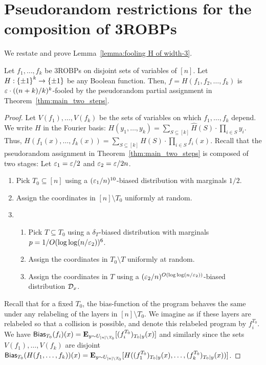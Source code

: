 \section{Pseudorandom restrictions for the composition of 3ROBPs}\label{app:composition 3ROBPs}
We restate and prove Lemma~\ref{lemma:fooling H of width-3}.
\begin{lemma}
Let $f_1, \ldots, f_k$ be 3ROBPs on disjoint sets of variables of $[n]$. 
Let $H:{\{\pm1\}}^k \to {\{\pm1\}}$ be any Boolean function.
Then, $f = H(f_1, f_2, \ldots, f_k)$ is $\varepsilon\cdot ((n+k)/k)^k$-fooled by the pseudorandom partial assignment in Theorem~\ref{thm:main_two_steps}.
\end{lemma}
\begin{proof}
Let $V(f_1), \ldots, V(f_k)$ be the sets of variables on which $f_1, \ldots, f_k$ depend.
We write $H$ in the Fourier basis:
$H(y_1, \ldots, y_k) = \sum_{S\subseteq [k]} \hat{H}(S) \cdot \prod_{i\in S}{y_i}$.
Thus,
$H(f_1(x), \ldots, f_k(x)) = \sum_{S\subseteq [k]} \hat{H}(S) \cdot \prod_{i\in S}{f_i(x)}$.
Recall that the pseudorandom assignment in Theorem~\ref{thm:main_two_steps} is composed of two stages:
Let $\varepsilon_1 = \varepsilon/2$ and $\varepsilon_2 = \varepsilon/2n$.
\begin{enumerate}
	\item Pick $T_0 \subseteq [n]$ using a $(\varepsilon_1/n)^{10}$-biased distribution with marginals $1/2$.
	\item Assign the coordinates in $[n]\setminus T_0$ uniformly at random.
	\item
	\begin{enumerate}
	\item Pick $T\subseteq T_0$ using a $\delta_T$-biased distribution with marginals $p = 1/O(\log \log ( n/\varepsilon_2))^{6}$.
	\item  Assign the coordinates in $T_0\setminus T$ uniformly at random.
	\item Assign the coordinates in $T$ using a $(\varepsilon_2/n)^{O(\log \log (n/\varepsilon_2))}$-biased distribution ${\mathcal{D}_x}$.
	\end{enumerate}
\end{enumerate}
Recall that for a fixed $T_0$,  the bias-function of the program behaves the same under any relabeling of the layers in $[n]\setminus T_0$. We imagine as if these layers are relabeled so that a collision is possible, and denote this relabeled program by $f_i^{T_0}$.
We have $\mathsf{Bias}_{T_0}(f_i)(x) = \mathop{\bf E\/}_{y\sim U_{[n]\setminus T_0}}[(f_i^{T_0})_{T_0|y}(x)]$ and similarly
since the sets $V(f_1), \ldots, V(f_k)$ are disjoint
$\mathsf{Bias}_{T_0}(H(f_1, \ldots, f_k))(x) = \mathop{\bf E\/}_{y\sim U_{[n]\setminus T_0}}[H((f_1^{T_0})_{T_0|y}(x), \ldots, (f_k^{T_0})_{T_0|y}(x))]$.

\end{proof}
